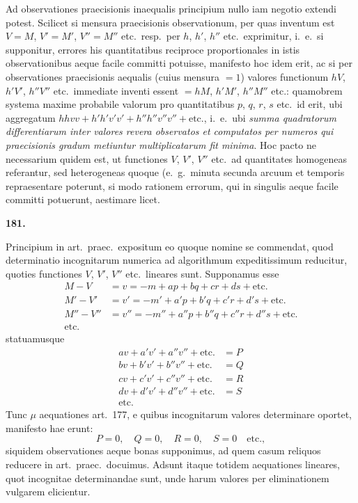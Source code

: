 \documentclass[11pt,a4paper]{article}
\begin{document}
Ad observationes praecisionis inaequalis principium nullo iam negotio extendi potest. Scilicet si mensura praecisionis observationum, per quas inventum est $V=M$, $V'=M'$, $V''=M''$ etc.\ resp.\ per $h$, $h'$, $h''$ etc.\ exprimitur, i.~e.\ si supponitur, errores his quantitatibus reciproce proportionales in istis observationibus aeque facile committi potuisse, manifesto hoc idem erit, ac si per observationes praecisionis aequalis (cuius mensura $=1$) valores functionum $hV$, $h'V'$, $h''V''$ etc.\ immediate inventi essent $= hM$, $h'M'$, $h''M''$ etc.: quamobrem systema maxime probabile valorum pro quantitatibus $p$, $q$, $r$, $s$ etc.\ id erit, ubi aggregatum $hhvv + h'h'v'v' + h''h''v''v'' + \text{etc.}$, i.~e.\ ubi \emph{summa quadratorum differentiarum inter valores revera observatos et computatos per numeros qui praecisionis gradum metiuntur multiplicatarum fit minima}. Hoc pacto ne necessarium quidem est, ut functiones $V$, $V'$, $V''$ etc.\ ad quantitates homogeneas referantur, sed heterogeneas quoque (e.~g.\ minuta secunda arcuum et temporis repraesentare poterunt, si modo rationem errorum, qui in singulis aeque facile committi potuerunt, aestimare licet.

\vspace{1em}

\noindent\textbf{181.}

Principium in art.\ praec.\ expositum eo quoque nomine se commendat, quod determinatio incognitarum numerica ad algorithmum expeditissimum reducitur, quoties functiones $V$, $V'$, $V''$ etc.\ lineares sunt. Supponamus esse
\begin{align*}
M - V &= v = -m + ap + bq + cr + ds + \text{etc.} \\
M' - V' &= v' = -m' + a'p + b'q + c'r + d's + \text{etc.} \\
M'' - V'' &= v'' = -m'' + a''p + b''q + c''r + d''s + \text{etc.} \\
\text{etc.} &\qquad
\end{align*}
statuamusque
\begin{align*}
av + a'v' + a''v'' + \text{etc.} &= P \\
bv + b'v' + b''v'' + \text{etc.} &= Q \\
cv + c'v' + c''v'' + \text{etc.} &= R \\
dv + d'v' + d''v'' + \text{etc.} &= S \\
\text{etc.} &\qquad
\end{align*}
Tunc $\mu$ aequationes art.~177, e quibus incognitarum valores determinare oportet, manifesto hae erunt:
\[
P = 0, \quad Q = 0, \quad R = 0, \quad S = 0 \quad \text{etc.},
\]
siquidem observationes aeque bonas supponimus, ad quem casum reliquos reducere in art.\ praec.\ docuimus. Adsunt itaque totidem aequationes lineares, quot incognitae determinandae sunt, unde harum valores per eliminationem vulgarem elicientur.
\end{document}
